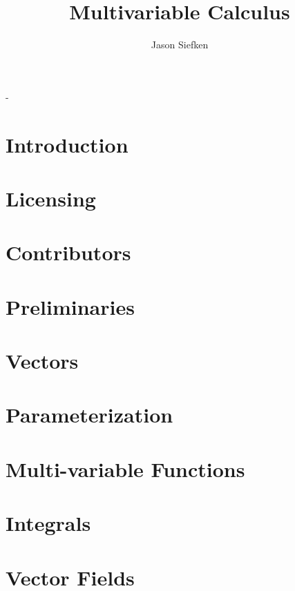 \documentclass[letter, 11pt, onesided]{memoir}
\author{Jason Siefken}
\title{Multivariable Calculus}
\numberwithin{dummy}{section}
\theoremstyle{orangenumbox}
\theoremstyle{ocrenumbox}
\theoremstyle{blacknumex}
\theoremstyle{blacknumbox}
\theoremstyle{ocrenum}
\begin{document}
\frontmatter
\begin{titlingpage}
	\calccentering{\unitlength}
	\begin{adjustwidth*}{\unitlength}{-\unitlength}
		\maketitle
	\end{adjustwidth*}
\end{titlingpage}

\clearpage

\tableofcontents*
\clearpage

\chapter{Introduction}
	
\chapter{Licensing}
	
\chapter{Contributors}
	
\mainmatter

\chapter{Preliminaries}
	
	\clearpage
\chapter{Vectors}
	
	\clearpage
\chapter{Parameterization}
	
	\clearpage
\chapter{Multi-variable Functions}
	
	\clearpage
\chapter{Integrals}
	
	\clearpage
\chapter{Vector Fields}
	
	\clearpage
\end{document}
